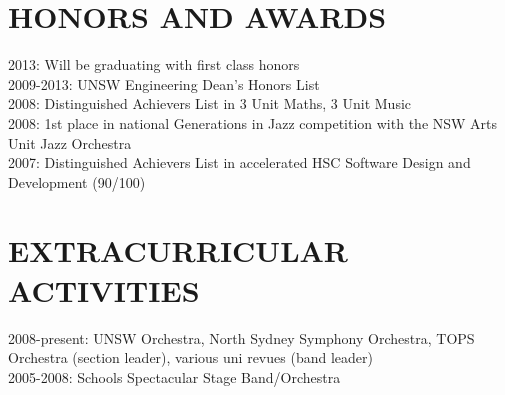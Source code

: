 \documentclass{res}
\begin{document}
\begin{resume}
 
\section{HONORS AND AWARDS}          
    2013: Will be graduating with first class honors \\
    2009-2013: UNSW Engineering Dean's Honors List \\
    2008: Distinguished Achievers List in 3 Unit Maths, 3 Unit Music \\
    2008: 1st place in national Generations in Jazz competition with the NSW Arts Unit Jazz Orchestra \\
    2007: Distinguished Achievers List in accelerated HSC Software Design and Development (90/100)
 
\section{EXTRACURRICULAR ACTIVITIES}          
    2008-present: UNSW Orchestra, North Sydney Symphony Orchestra, TOPS Orchestra (section leader), various uni revues (band leader) \\
    2005-2008: Schools Spectacular Stage Band/Orchestra
 
\end{resume}
\end{document}
